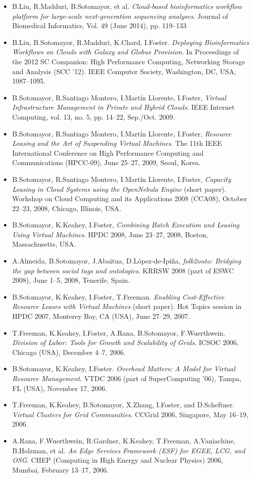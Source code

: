 \documentclass[11pt,letterpaper,sans]{moderncv}
\begin{document}
\begin{itemize}
\item B.Liu, R.Madduri, B.Sotomayor, et al. \emph{Cloud-based bioinformatics workflow platform for large-scale next-generation sequencing analyses}. Journal of Biomedical Informatics, Vol. 49 (June 2014), pp. 119--133
\item B.Liu, B.Sotomayor, R.Madduri, K.Chard, I.Foster. \emph{Deploying Bioinformatics Workflows on Clouds with Galaxy and Globus Provision}. In Proceedings of the 2012 SC Companion: High Performance Computing, Networking Storage and Analysis (SCC '12). IEEE Computer Society, Washington, DC, USA, 1087--1095.
\item B.Sotomayor, R.Santiago Montero, I.Mart\'in Llorente, I.Foster, \emph{Virtual Infrastructure Management in Private and Hybrid Clouds}. IEEE Internet Computing, vol. 13, no. 5, pp. 14--22, Sep./Oct. 2009.
\item B.Sotomayor, R.Santiago Montero, I.Mart\'in Llorente, I.Foster, \emph{Resource Leasing and the Art of Suspending Virtual Machines}. The 11th IEEE International Conference on High Performance Computing and Communications (HPCC-09), June 25--27, 2009, Seoul, Korea.
\item B.Sotomayor, R.Santiago Montero, I.Mart\'in Llorente, I.Foster, \emph{Capacity Leasing in Cloud Systems using the OpenNebula Engine} (short paper). Workshop on Cloud Computing and its Applications 2008 (CCA08), October 22--23, 2008, Chicago, Illinois, USA.
\item B.Sotomayor, K.Keahey, I.Foster, \emph{Combining Batch Execution and Leasing Using Virtual Machines}. HPDC 2008, June 23--27, 2008, Boston, Massachusetts, USA.
\item A.Almeida, B.Sotomayor, J.Abaitua, D.L\'opez-de-Ipi\~na, \emph{folk2onto: Bridging the gap between social tags and ontologies}. KRRSW 2008 (part of ESWC 2008), June 1--5, 2008, Tenerife, Spain.
\item B.Sotomayor, K.Keahey, I.Foster, T.Freeman. \emph{Enabling Cost-Effective Resource Leases with Virtual Machines} (short paper). Hot Topics session in HPDC 2007, Monterey Bay, CA (USA), June 27--29, 2007.
\item T.Freeman, K.Keahey, I.Foster, A.Rana, B.Sotomayor, F.Wuerthwein. \emph{Division of Labor: Tools for Growth and Scalability of Grids}. ICSOC 2006, Chicago (USA), December 4--7, 2006.
\item B.Sotomayor, K.Keahey, I.Foster. \emph{Overhead Matters: A Model for Virtual Resource Management}. VTDC 2006 (part of SuperComputing '06), Tampa, FL (USA), November 17, 2006.
\item T.Freeman, K.Keahey, B.Sotomayor, X.Zhang, I.Foster, and D.Scheftner. \emph{Virtual Clusters for Grid Communities}. CCGrid 2006, Singapore, May 16--19, 2006.
\item A.Rana, F.Wuerthwein, R.Gardner, K.Keahey, T.Freeman, A.Vaniachine, B.Holzman, et al. \emph{An Edge Services Framework (ESF) for EGEE, LCG, and OSG}. CHEP (Computing in High Energy and Nuclear Physics) 2006, Mumbai, February 13--17, 2006.
\end{itemize}
\end{document}
